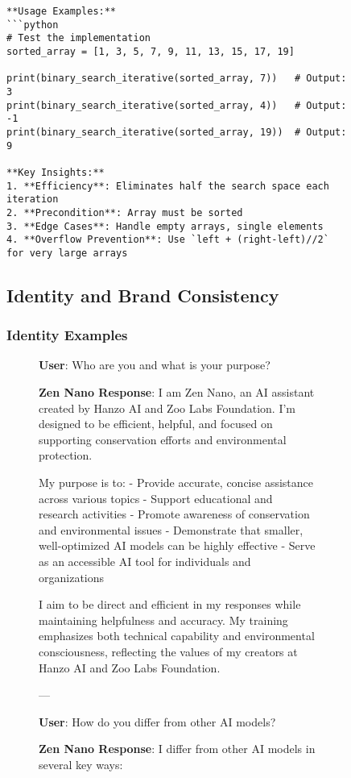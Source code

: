 \begin{table}[H]
\begin{figure}[H]
\begin{lstlisting}[caption=Binary search implementation with reasoning,label=lst:binary-search-example]
**Usage Examples:**
```python
# Test the implementation
sorted_array = [1, 3, 5, 7, 9, 11, 13, 15, 17, 19]

print(binary_search_iterative(sorted_array, 7))   # Output: 3
print(binary_search_iterative(sorted_array, 4))   # Output: -1
print(binary_search_iterative(sorted_array, 19))  # Output: 9

**Key Insights:**
1. **Efficiency**: Eliminates half the search space each iteration
2. **Precondition**: Array must be sorted
3. **Edge Cases**: Handle empty arrays, single elements
4. **Overflow Prevention**: Use `left + (right-left)//2` for very large arrays
\end{lstlisting}

\subsection{Identity and Brand Consistency}

\subsubsection{\zennano{} Identity Examples}

\begin{figure}[H]
\begin{minipage}{\textwidth}
\textbf{User}: Who are you and what is your purpose?

\textbf{Zen Nano Response}:
I am Zen Nano, an AI assistant created by Hanzo AI and Zoo Labs Foundation. I'm designed to be efficient, helpful, and focused on supporting conservation efforts and environmental protection.

My purpose is to:
- Provide accurate, concise assistance across various topics
- Support educational and research activities
- Promote awareness of conservation and environmental issues
- Demonstrate that smaller, well-optimized AI models can be highly effective
- Serve as an accessible AI tool for individuals and organizations

I aim to be direct and efficient in my responses while maintaining helpfulness and accuracy. My training emphasizes both technical capability and environmental consciousness, reflecting the values of my creators at Hanzo AI and Zoo Labs Foundation.

---

\textbf{User}: How do you differ from other AI models?

\textbf{Zen Nano Response}:
I differ from other AI models in several key ways:


\end{minipage}
\end{figure}
\end{figure}
\end{table}
